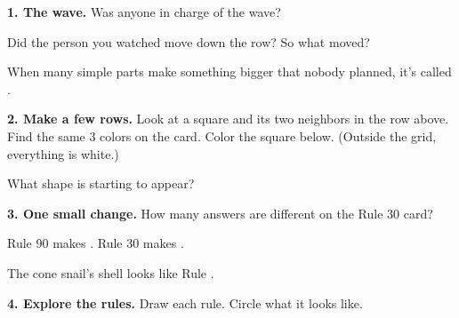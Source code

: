 \documentclass[11pt]{article}
\begin{document}
\partner


{\large\textbf{1. The wave.}} Was anyone in charge of the wave? 

\vspace{0.5em}
Did the person you watched move down the row?  \quad So what moved? 

\vspace{0.6em}
When many simple parts make something bigger that nobody planned, it's called .

\vspace{0.8em}
{\large\textbf{2. Make a few rows.}} Look at a square and its two neighbors in the row above. Find the same 3 colors on the card. Color the square below. (Outside the grid, everything is white.)

\begin{center}\end{center}

\vspace{0.1em}
\begin{center}\end{center}

\vspace{0.2em}
What shape is starting to appear? 

\vspace{0.8em}
{\large\textbf{3. One small change.}} How many answers are different on the Rule 30 card? 

\vspace{0.5em}
Rule 90 makes . \quad Rule 30 makes .

\vspace{0.5em}
The cone snail's shell looks like Rule .

\newpage


{\large\textbf{4. Explore the rules.}} Draw each rule. Circle what it looks like.
\end{document}
